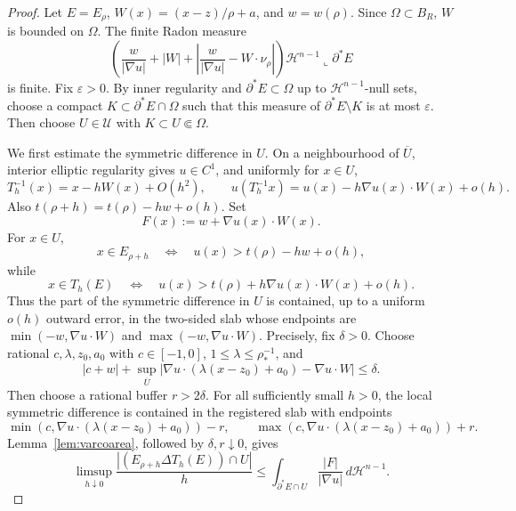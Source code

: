 \documentclass[11pt]{amsart}
\theoremstyle{definition}
\newcommand{\Om}{\Omega}
\newcommand{\rstar}{\rho_*}
\newcommand{\wt}{w}
\newcommand{\eps}{\varepsilon}
\newcommand{\Hn}{\mathcal H^{n-1}}
\begin{document}
\begin{proof}
Let \(E=E_\rho\), \(W(x)=(x-z)/\rho+a\), and \(w=\wt(\rho)\).  Since
\(\Om\subset B_R\), \(W\) is bounded on \(\Om\).  The finite Radon measure
\[
   \left(
      \frac{w}{|\nabla u|}+|W|
      +\left|\frac{w}{|\nabla u|}-W\cdot\nu_\rho\right|
   \right)\Hn\llcorner\partial^*E
\]
is finite.  Fix \(\eps>0\).  By inner regularity and
\(\partial^*E\subset\Om\) up to \(\Hn\)-null sets, choose a compact
\(K\subset\partial^*E\cap\Om\) such that this measure of
\(\partial^*E\setminus K\) is at most \(\eps\).  Then choose
\(U\in\mathcal U\) with \(K\subset U\Subset\Om\).

We first estimate the symmetric difference in \(U\).  On a neighbourhood of
\(\overline U\), interior elliptic regularity gives \(u\in C^1\), and
uniformly for \(x\in U\),
\[
   T_h^{-1}(x)=x-hW(x)+O(h^2),\qquad
   u(T_h^{-1}x)=u(x)-h\nabla u(x)\cdot W(x)+o(h).
\]
Also \(t(\rho+h)=t(\rho)-hw+o(h)\).  Set
\[
   F(x):=w+\nabla u(x)\cdot W(x).
\]
For \(x\in U\),
\[
   x\in E_{\rho+h}
   \quad\Longleftrightarrow\quad u(x)>t(\rho)-hw+o(h),
\]
while
\[
   x\in T_h(E)
   \quad\Longleftrightarrow\quad u(x)>t(\rho)+h\nabla u(x)\cdot W(x)+o(h).
\]
Thus the part of the symmetric difference in \(U\) is contained, up to a
uniform \(o(h)\) outward error, in the two-sided slab whose endpoints are
\(\min(-w,\nabla u\cdot W)\) and \(\max(-w,\nabla u\cdot W)\).
Precisely, fix \(\delta>0\).  Choose rational
\(c,\lambda,z_0,a_0\) with \(c\in[-1,0]\), \(1\le\lambda\le\rstar^{-1}\),
and
\[
   |c+w|+
   \sup_{\overline U}
   |\nabla u\cdot(\lambda(x-z_0)+a_0)-\nabla u\cdot W|
   \le\delta .
\]
Then choose a rational buffer \(r>2\delta\).  For all sufficiently small
\(h>0\), the local symmetric difference is contained in the registered slab
with endpoints
\[
   \min(c,\nabla u\cdot(\lambda(x-z_0)+a_0))-r,\qquad
   \max(c,\nabla u\cdot(\lambda(x-z_0)+a_0))+r .
\]
Lemma~\ref{lem:varcoarea}, followed by \(\delta,r\downarrow0\), gives
\[
   \limsup_{h\downarrow0}\frac{|(E_{\rho+h}\Delta T_h(E))\cap U|}{h}
   \le
   \int_{\partial^*E\cap U}\frac{|F|}{|\nabla u|}\,d\Hn .
\]


\end{proof}
\end{document}
